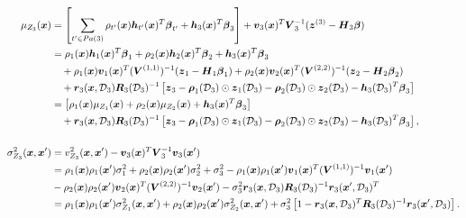\documentclass[12pt]{article}
\newcommand{\bs}[1]{\boldsymbol{#1}}
\newcommand{\cbl}[1]{{\color{black}{#1}}}
\begin{document}
\begin{align*}
    \mu_{Z_3}(\bs{x}) &=  \left[\sum_{t'\in Pa(3)}\rho_{t'}(\bs{x})\bs{h}_{t'}(\bs{x})^T\bs{\beta}_{t'}+\bs{h}_3(\bs{x})^T\bs{\beta}_3\right] + \bs{v}_3(\bs{x})^T\bs{V}_3^{-1}(\bs{z}^{(3)}-\bs{H}_3\bs{\beta})\\
    &= \rho_{1}(\bs{x})\bs{h}_{1}(\bs{x})^T\bs{\beta}_{1} + \rho_{2}(\bs{x})\bs{h}_{2}(\bs{x})^T\bs{\beta}_{2} + \bs{h}_3(\bs{x})^T\bs{\beta}_3\\
    &\quad + \rho_1(\bs{x}) \bs{v}_1(\bs{x})^T(\bs{V}^{(1,1)})^{-1}(\bs{z}_1-\bs{H}_1\bs{\beta}_1) + \rho_2(\bs{x}) \bs{v}_2(\bs{x})^T(\bs{V}^{(2,2)})^{-1}(\bs{z}_2-\bs{H}_2\bs{\beta}_2)\\
    &\quad + \bs{r}_3(\bs{x},\mathcal{D}_3)\bs{R}_3(\mathcal{D}_3)^{-1}\left[\bs{z}_3 - \bs{\rho}_1(\mathcal{D}_3)\odot \bs{z}_1(\mathcal{D}_3) - \bs{\rho}_2(\mathcal{D}_3)\odot \bs{z}_2(\mathcal{D}_3) - \bs{h}_3(\mathcal{D}_3)^T\bs{\beta}_3\right]\\
    &= \left[\rho_1(\bs{x})\mu_{Z_1}(\bs{x}) + \rho_2(\bs{x})\mu_{Z_2}(\bs{x}) + \bs{h}_3(\bs{x})^T\bs{\beta}_3\right]\\
    &\quad + \bs{r}_3(\bs{x},\mathcal{D}_3)\bs{R}_3(\mathcal{D}_3)^{-1}\left[\bs{z}_3 - \bs{\rho}_1(\mathcal{D}_3)\odot \bs{z}_1(\mathcal{D}_3) - \bs{\rho}_2(\mathcal{D}_3)\odot \bs{z}_2(\mathcal{D}_3) - \bs{h}_3(\mathcal{D}_3)^T\bs{\beta}_3\right],\\
    \\
    \sigma_{Z_3}^2(\bs{x},\cbl{\bs{x}'}) &= v^2_{Z_3}(\bs{x},\cbl{\bs{x}'}) - \bs{v}_3(\bs{x})^T\bs{V}_3^{-1}\bs{v}_3(\cbl{\bs{x}'})\\
    &= \cbl{\rho_1(\bs{x})\rho_1(\bs{x}')}\sigma_1^2 + \cbl{\rho_2(\bs{x})\rho_2(\bs{x}')}\sigma_2^2 + \sigma_3^2 -\cbl{\rho_1(\bs{x})\rho_1(\bs{x}')}\bs{v}_1(\bs{x})^T(\bs{V}^{(1,1)})^{-1}\bs{v}_1(\cbl{\bs{x}'})\\
    &-\cbl{\rho_2(\bs{x})\rho_2(\bs{x}')}\bs{v}_2(\bs{x})^T(\bs{V}^{(2,2)})^{-1}\bs{v}_2(\cbl{\bs{x}'}) - \sigma_3^2\bs{r}_3(\bs{x},\mathcal{D}_3)\bs{R}_3(\mathcal{D}_3)^{-1}\bs{r}_3(\cbl{\bs{x}'},\mathcal{D}_3)^T\\
    &= \cbl{\rho_1(\bs{x})\rho_1(\bs{x}')}\sigma^2_{Z_1}(\bs{x},\cbl{\bs{x}'}) + \cbl{\rho_2(\bs{x})\rho_2(\bs{x}')}\sigma^2_{Z_2}(\bs{x},\cbl{\bs{x}'}) + \sigma_3^2\left[1-\bs{r}_3(\bs{x},\mathcal{D}_3)^T\bs{R}_3(\mathcal{D}_3)^{-1}\bs{r}_3(\cbl{\bs{x}'},\mathcal{D}_3)\right].
\end{align*}
\end{document}
